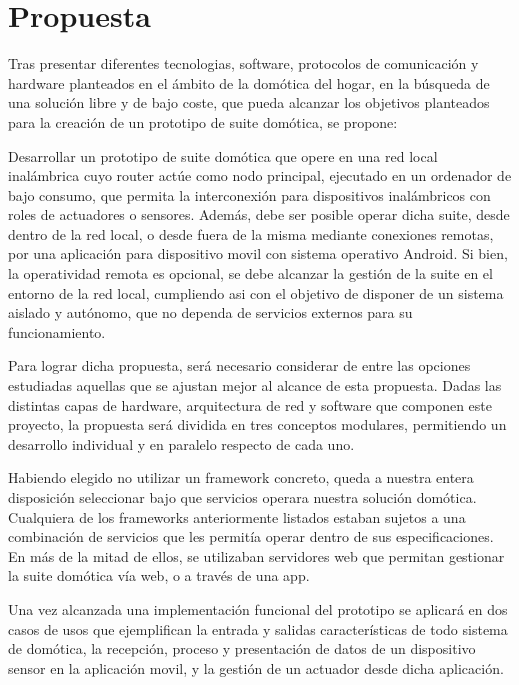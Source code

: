 \cleardoublepage

\chapter{Propuesta}
\label{ch:Capitulo3}

Tras presentar diferentes tecnologias, software, protocolos de comunicación y hardware planteados en el ámbito de la domótica del hogar, en la búsqueda de una solución libre y de bajo coste, que pueda alcanzar los objetivos planteados para la creación de un prototipo de suite domótica, se propone:

Desarrollar un prototipo de suite domótica que opere en una red local inalámbrica cuyo router actúe como nodo principal, ejecutado en un ordenador de bajo consumo, que permita la interconexión para dispositivos inalámbricos con roles de actuadores o sensores. Además, debe ser posible operar dicha suite, desde dentro de la red local, o desde fuera de la misma mediante conexiones remotas, por una aplicación para dispositivo movil con sistema operativo Android. Si bien, la operatividad remota es opcional, se debe alcanzar la gestión de la suite en el entorno de la red local, cumpliendo asi con el objetivo de disponer de un sistema aislado y autónomo, que no dependa de servicios externos para su funcionamiento.

Para lograr dicha propuesta, será necesario considerar de entre las opciones estudiadas aquellas que se ajustan mejor al alcance de esta propuesta. Dadas las distintas capas de hardware, arquitectura de red y software que componen este proyecto, la propuesta será dividida en tres conceptos modulares, permitiendo un desarrollo individual y en paralelo respecto de cada uno.

Habiendo elegido no utilizar un framework concreto, queda a nuestra entera disposición seleccionar bajo que servicios operara nuestra solución domótica. Cualquiera de los frameworks anteriormente listados estaban sujetos a una combinación de servicios que les permitía operar dentro de sus especificaciones. En más de la mitad de ellos, se utilizaban servidores web que permitan gestionar la suite domótica vía web, o a través de una app.

Una vez alcanzada una implementación funcional del prototipo se aplicará en dos casos de usos que ejemplifican la entrada y salidas características de todo sistema de domótica, la recepción, proceso y presentación de datos de un dispositivo sensor en la aplicación movil, y la gestión de un actuador desde dicha aplicación.

